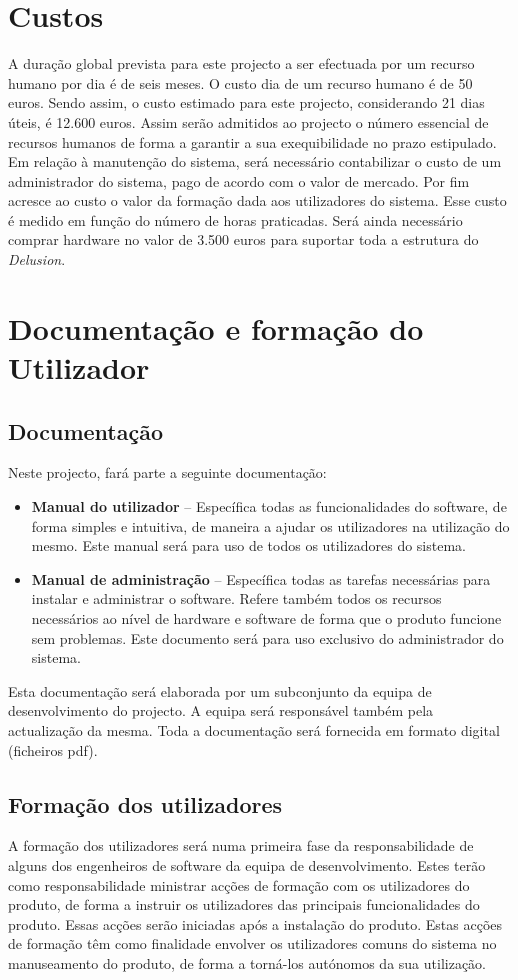  
\section{Custos}
A duração global prevista para este projecto a ser efectuada por um recurso humano por dia é de seis meses. O custo dia de um recurso humano é de 50 euros. Sendo assim, o custo estimado para este projecto, considerando 21 dias úteis, é 12.600 euros. Assim serão admitidos ao projecto o número essencial de recursos humanos de forma a garantir a sua exequibilidade no prazo estipulado. 
Em relação à manutenção do sistema, será necessário contabilizar o custo de um administrador do sistema, pago de acordo com o valor de mercado.
Por fim acresce ao custo o valor da formação dada aos utilizadores do sistema. Esse custo é medido em função do número de horas praticadas.
Será ainda necessário comprar hardware no valor de 3.500 euros para suportar toda a estrutura do \textit{Delusion}.

\section{Documentação e formação do Utilizador}
\subsection{Documentação}
Neste projecto, fará parte a seguinte documentação:

\begin{itemize}
\item \textbf{Manual do utilizador} – Específica todas as funcionalidades do software, de forma simples e intuitiva, de maneira a ajudar os utilizadores na utilização do mesmo. Este manual será para uso de todos os utilizadores do sistema.

\item \textbf{Manual de administração} – Específica todas as tarefas necessárias para instalar e administrar o software. Refere também todos os recursos necessários ao nível de hardware e software de forma que o produto funcione sem problemas. Este documento será para uso exclusivo do administrador do sistema.
\end{itemize}

Esta documentação será elaborada por um subconjunto da equipa de desenvolvimento do projecto. A equipa será responsável também pela actualização da mesma. Toda a documentação será fornecida em formato digital (ficheiros pdf). 

\subsection{Formação dos utilizadores}
A formação dos utilizadores será numa primeira fase da responsabilidade de alguns dos engenheiros de software da equipa de desenvolvimento. Estes terão como responsabilidade ministrar acções de formação com os utilizadores do produto, de forma a instruir os utilizadores das principais funcionalidades do produto. Essas acções serão iniciadas após a instalação do produto. Estas acções de formação têm como finalidade envolver os utilizadores comuns do sistema no manuseamento do produto, de forma a torná-los autónomos da sua utilização.
